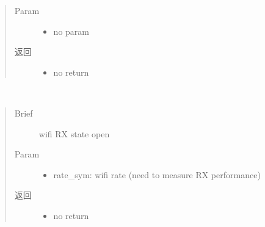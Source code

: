 \documentclass[letterpaper,10pt,english]{sphinxhowto}
\begin{document}
\begin{fulllineitems}
\begin{fulllineitems}
\begin{quote}
\begin{description}
\item[{Param}] \leavevmode\begin{itemize}
\item {} 
no param

\end{itemize}

\item[{返回}] \leavevmode
\begin{itemize}
\item {} 
no return

\end{itemize}


\end{description}\end{quote}

\end{fulllineitems}


\begin{fulllineitems}
\label{\detokenize{rfapi/index:wifi_api.WIFIAPI.rxdc_cal}}
\end{fulllineitems}


\begin{fulllineitems}
\label{\detokenize{rfapi/index:wifi_api.WIFIAPI.rxstart}}~\begin{quote}\begin{description}
\item[{Brief}] \leavevmode
wifi RX state open

\item[{Param}] \leavevmode\begin{itemize}
\item {} 
rate\_sym:  wifi rate (need to measure RX performance)

\end{itemize}

\item[{返回}] \leavevmode
\begin{itemize}
\item {} 
no return

\end{itemize}


\end{description}\end{quote}


\end{fulllineitems}
\end{fulllineitems}
\end{document}
